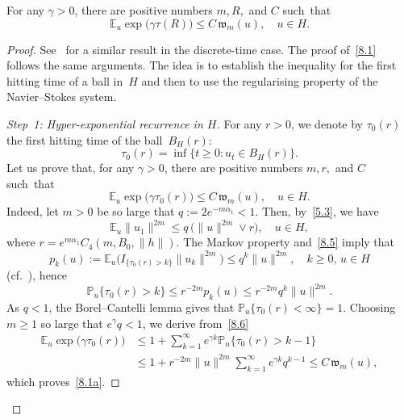 \documentclass[AHL,Unicode,longabstracts]{cedram}
\newcommand{\IP}{{\mathbb P}}
\newcommand{\E}{{\mathbb E}}
\newcommand{\ty}{\infty}
\newcommand{\wwww}{{\mathfrak w}}
\newenvironment{step}{\begin{proof}}{\let\qed\relax \end{proof}}
\begin{document}
\begin{prop}\label{P:2.1}
For any $\gamma>0$, there are positive numbers $m,R,$ and $C$ such~that
\begin{equation}\label{8.1}
\E_u\exp\bigl(\gamma \tau(R)\bigr)\le C\,\wwww_m(u),
\quad u\in H.
\end{equation}
\end{prop}

\begin{proof}
See~\cite[Proposition~5.1]{JNPS-2014} for a similar result in the discrete-time case. The proof of~\eqref{8.1} follows the same arguments. The idea is to establish the inequality for the first hitting time of a ball in~$H$ and then to use the regularising property of the Navier--Stokes system.

\begin{step}[Step~1: Hyper-exponential recurrence in $H$]
For any $r>0$, we denote by $\tau_0(r)$ the first hitting time of the ball~$B_{H}(r)$:
\[
\tau_0(r)=\inf\{t\ge0:u_{t}\in B_{H}(r)\}.
\]
Let us prove that, for any $\gamma>0$, there are positive numbers $m,r,$ and $C$ such~that
\begin{equation}\label{8.1a}
\E_u\exp\bigl(\gamma \tau_{0}(r)\bigr)\le C\,\wwww_m(u),
\quad u\in H.
\end{equation}
Indeed, let $m>0$ be so large that $q:=2e^{-m\alpha_1 }<1$. Then, by~\eqref{5.3}, we have
\begin{equation}\label{8.5}
\E_u\|u_1\|^{2m}\le q\,\bigl(\|u\|^{2m}\vee r\bigr),\quad u\in H,
\end{equation}
where $r=e^{m\alpha_1 } C_4(m, B_0, \|h\|).$ The Markov property and~\eqref{8.5} imply that
\[
p_k(u):=\E_u\bigl(I_{\{\tau_0(r)>k\}}\|u_k\|^{2m}\bigr)\le q^k\|u\|^{2m},\quad k\ge0,\, u\in H
\]
(cf.~\cite[proof of Lemma~3.6.1]{KS-book}),
hence
\begin{equation}\label{8.6}
\IP_u\{\tau_0(r)>k\}\le r^{-2m}p_k(u)\le r^{-2m} q^k\|u\|^{2m}.
\end{equation}
As $q<1$, the Borel--Cantelli lemma gives that $\IP_u\{\tau_0(r)<\ty\}=1$. Choosing~$m\ge1$ so large that $e^{\gamma} q<1$, we derive from~\eqref{8.6}
\begin{align*}
\E_u\exp\bigl(\gamma \tau_0(r)\bigr)&\le1+\sum_{k=1}^\infty e^{\gamma k}\IP_u\{\tau_0(r)>k-1\}\\
&\le1+r^{-2m}\|u\|^{2m}\sum_{k=1}^\infty e^{\gamma k}q^{k-1}\le C\,\wwww_m(u),
\end{align*}
which proves~\eqref{8.1a}.
\end{step}


\end{proof}
\end{document}
